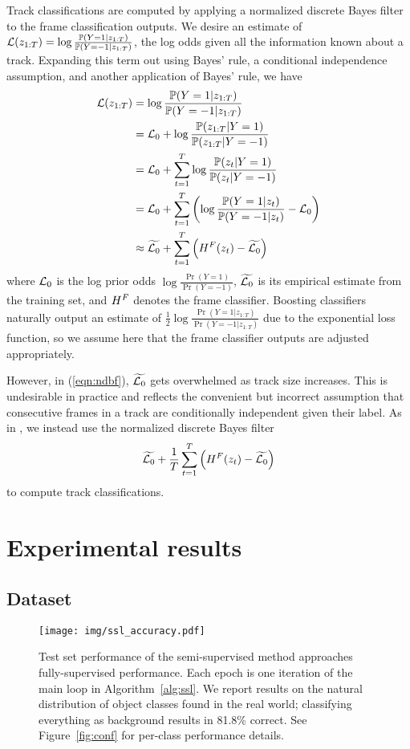 \documentclass[conference]{IEEEtran}
\newcommand{\logodds}[1]{\log \frac{\Pr(Y = 1 | #1)}{\Pr(Y = -1 | #1)}}
\newcommand{\logprior}{\log \frac{\Pr(Y = 1)}{\Pr(Y = -1)}}
\newcommand{\zT}{z_{1:T}}
\begin{document}
Track classifications are computed by applying a normalized discrete Bayes filter to the frame classification outputs.  We desire an estimate of $\L(\zT) = \logodds{\zT}$, the log odds given all the information known about a track.  Expanding this term out using Bayes' rule, a conditional independence assumption, and another application of Bayes' rule, we have
\begin{align}
  \L(z_{1:T}) & = \logodds{\zT} \notag \\
  & =  \L_0 + \log \frac{\Pr(\zT | Y = 1)}{\Pr(\zT | Y = -1)} \notag \\
  & = \L_0 + \sum_{t=1}^T \log \frac{\Pr(z_t | Y = 1)}{\Pr(z_t | Y = -1)} \notag \\
  & = \L_0 + \sum_{t=1}^T \left( \log \frac{\Pr(Y = 1 | z_t)}{\Pr(Y = -1 | z_t)} - \L_0 \right) \notag \\
  & \approx \widetilde{\L_0} + \sum_{t=1}^T \left( \Hf(z_t) -\widetilde{\L_0} \right) \label{eqn:ndbf}
\end{align}
where $\mathcal{L}_0$ is the log prior odds $\logprior$, $\widetilde{\mathcal{L}_0}$ is its empirical estimate from the training set, and $\Hf$ denotes the frame classifier.  Boosting classifiers naturally output an estimate of $\frac{1}{2} \logodds{\zT}$ due to the exponential loss function, so we assume here that the frame classifier outputs are adjusted appropriately.

However, in (\ref{eqn:ndbf}), $\widetilde{\mathcal{L}_0}$ gets overwhelmed as track size increases.  This is undesirable in practice and reflects the convenient but incorrect assumption that consecutive frames in a track are conditionally independent given their label.  As in \cite{Teichman2011}, we instead use the normalized discrete Bayes filter
\begin{align*}
\widetilde{\L_0} +\frac{1}{T} \sum_{t=1}^T \left( \Hf(z_t) - \widetilde{\L_0} \right) \label{eqn:htr}
\end{align*}
to compute track classifications.

\section{Experimental results}

\subsection{Dataset}

\begin{figure}
  \centering
  \texttt{[image: img/ssl\_accuracy.pdf]}
  \caption{Test set performance of the semi-supervised method approaches fully-supervised performance.  Each epoch is one iteration of the main loop in Algorithm~\ref{alg:ssl}.  We report results on the natural distribution of object classes found in the real world; classifying everything as background results in 81.8\% correct.  See Figure~\ref{fig:conf} for per-class performance details.}
  \label{fig:core}
\end{figure}
\end{document}
